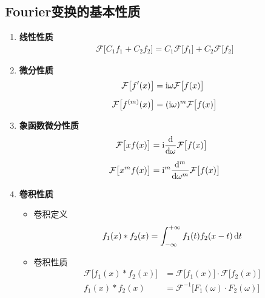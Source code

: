 \subsection{Fourier变换的基本性质}
\begin{enumerate}[\textbf{性质} 1 ]
	\item \textbf{线性性质} 
	\begin{align}
		\mathcal{F}\big[C_1f_1 + C_2 f_2\big] = C_1 \mathcal{F}\big[f_1\big] + C_2 \mathcal{F}\big[f_2\big] 
	\end{align}
	
	\item \textbf{微分性质}
	\begin{align}
		\mathcal{F}\big[f'(x)\big] &= {\rm{i}} \omega \mathcal{F}\big[f(x)\big]\\[0.5em]
		\mathcal{F}\big[f^{(m)}(x)\big] &= ({\rm{i}} \omega)^{m} \mathcal{F}\big[f(x)\big]
	\end{align}
	
	\item \textbf{象函数微分性质}
	\begin{align}
		\mathcal{F}\big[xf(x)\big] &= {\rm{i}} \dfrac{{\rm{d}} }{{\rm{d}} \omega}\mathcal{F}\big[f(x)\big]\\[0.5em]
		\mathcal{F} \big[x^m f(x)\big] &= {\rm{i}}^m \dfrac{{\rm{d}}^m}{{\rm{d}} \omega^m} \mathcal{F}\big[f(x)\big]
	\end{align}
	
	\item \textbf{卷积性质}
	\begin{itemize}
		\item 卷积定义
		\begin{align}
			f_1(x) * f_2(x) = \int_{- \infty}^{+ \infty} f_1(t)f_2(x - t)\, {\rm{d}} t
		\end{align}
		\item 卷积性质
		\begin{align}
			\mathcal{F}\big[f_1(x) * f_2(x)\big] &= \mathcal{F}\big[f_1(x)\big] \cdot \mathcal{F}\big[f_2(x)\big]\\[0.5em]
			f_1(x) * f_2(x) &= \mathcal{F}^{-1}\big[F_1(\omega)\cdot F_2(\omega)\big]
		\end{align}
	\end{itemize}
\end{enumerate}

